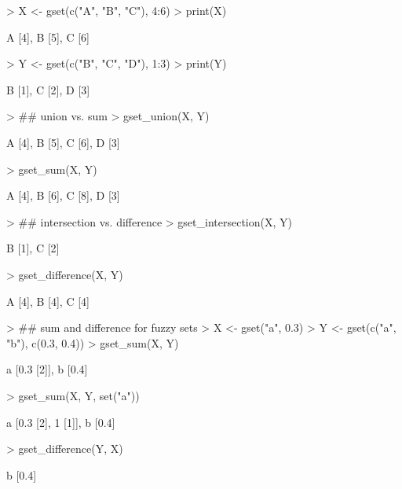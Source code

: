 \documentclass[fleqn]{article}
\begin{document}
\begin{Schunk}
\begin{Sinput}
> X <- gset(c("A", "B", "C"), 4:6)
> print(X)
\end{Sinput}
\begin{Soutput}
{A [4], B [5], C [6]}
\end{Soutput}
\begin{Sinput}
> Y <- gset(c("B", "C", "D"), 1:3)
> print(Y)
\end{Sinput}
\begin{Soutput}
{B [1], C [2], D [3]}
\end{Soutput}
\begin{Sinput}
> ## union vs. sum
> gset_union(X, Y)
\end{Sinput}
\begin{Soutput}
{A [4], B [5], C [6], D [3]}
\end{Soutput}
\begin{Sinput}
> gset_sum(X, Y)
\end{Sinput}
\begin{Soutput}
{A [4], B [6], C [8], D [3]}
\end{Soutput}
\begin{Sinput}
> ## intersection vs. difference
> gset_intersection(X, Y)
\end{Sinput}
\begin{Soutput}
{B [1], C [2]}
\end{Soutput}
\begin{Sinput}
> gset_difference(X, Y)
\end{Sinput}
\begin{Soutput}
{A [4], B [4], C [4]}
\end{Soutput}
\begin{Sinput}
> ## sum and difference for fuzzy sets
> X <- gset("a", 0.3)
> Y <- gset(c("a", "b"), c(0.3, 0.4))
> gset_sum(X, Y)
\end{Sinput}
\begin{Soutput}
{a [{0.3 [2]}], b [{0.4}]}
\end{Soutput}
\begin{Sinput}
> gset_sum(X, Y, set("a"))
\end{Sinput}
\begin{Soutput}
{a [{0.3 [2], 1 [1]}], b [{0.4}]}
\end{Soutput}
\begin{Sinput}
> gset_difference(Y, X)
\end{Sinput}
\begin{Soutput}
{b [{0.4}]}
\end{Soutput}
\end{Schunk}
\end{document}
